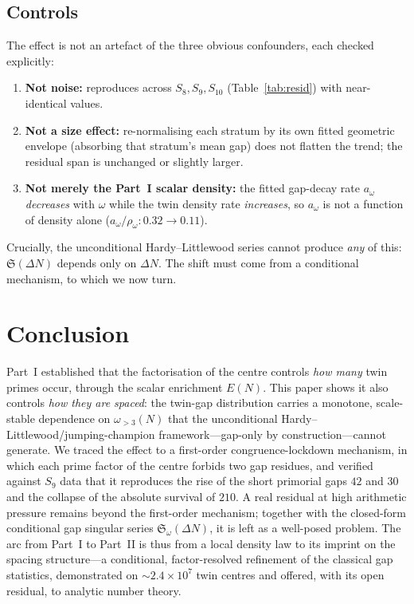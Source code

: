\documentclass[11pt]{article}
\theoremstyle{remark}\newtheorem{remark}{Remark}
\begin{document}
\subsection{Controls}
The effect is not an artefact of the three obvious confounders, each checked
explicitly:
\begin{enumerate}[label=(\arabic*)]
  \item \textbf{Not noise:} reproduces across $S_8,S_9,S_{10}$
        (Table~\ref{tab:resid}) with near-identical values.
  \item \textbf{Not a size effect:} re-normalising each stratum by its own
        fitted geometric envelope (absorbing that stratum's mean gap) does not
        flatten the trend; the residual span is unchanged or slightly larger.
  \item \textbf{Not merely the Part~I scalar density:} the fitted gap-decay rate
        $a_\omega$ \emph{decreases} with $\omega$ while the twin density rate
        \emph{increases}, so $a_\omega$ is not a function of density alone
        ($a_\omega/\rho_\omega:0.32\to0.11$).
\end{enumerate}
Crucially, the unconditional Hardy--Littlewood series cannot produce \emph{any}
of this: $\mathfrak{S}(\Delta N)$ depends only on $\Delta N$. The shift must come
from a conditional mechanism, to which we now turn.



\section{Conclusion}

Part~I established that the factorisation of the centre controls \emph{how many}
twin primes occur, through the scalar enrichment $E(N)$. This paper shows it also
controls \emph{how they are spaced}: the twin-gap distribution carries a
monotone, scale-stable dependence on $\omega_{>3}(N)$ that the unconditional
Hardy--Littlewood/jumping-champion framework---gap-only by construction---cannot
generate. We traced the effect to a first-order congruence-lockdown mechanism,
in which each prime factor of the centre forbids two gap residues, and verified
against $S_9$ data that it reproduces the rise of the short primorial gaps $42$
and $30$ and the collapse of the absolute survival of $210$. A real residual at
high arithmetic pressure remains beyond the first-order mechanism; together with
the closed-form conditional gap singular series $\mathfrak{S}_\omega(\Delta N)$,
it is left as a well-posed problem. The arc from Part~I to Part~II is thus from a
local density law to its imprint on the spacing structure---a conditional,
factor-resolved refinement of the classical gap statistics, demonstrated on
$\sim\!2.4\times10^{7}$ twin centres and offered, with its open residual, to
analytic number theory.
\end{document}
